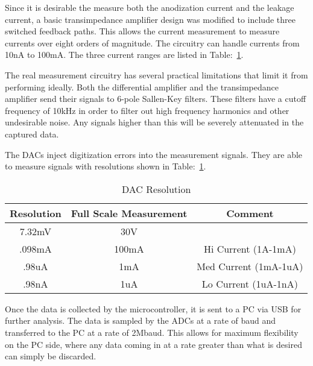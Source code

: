 Since it is desirable the measure both the anodization current and the leakage current, a basic transimpedance amplifier design was modified to include three switched feedback paths. This allows the current measurement to measure currents over eight orders of magnitude. The circuitry can handle currents from 10nA to 100mA. The three current ranges are listed in Table:~\ref{tab:dacRes}.

The real measurement circuitry has several practical limitations that limit it from performing ideally. Both the differential amplifier and the transimpedance amplifier send their signals to 6-pole Sallen-Key filters. These filters have a cutoff frequency of 10kHz\cite{sThesis} in order to filter out high frequency harmonics and other undesirable noise. Any signals higher than this will be severely attenuated in the captured data.

The DACs inject digitization errors into the measurement signals. They are able to measure signals with resolutions shown in Table:~\ref{tab:dacRes}.


\begin{table}[here]
\renewcommand{\arraystretch}{1.3}
\caption{DAC Resolution}
\label{tab:dacRes}
\centering
\begin{tabular}{c|c|c}
\hline
\bfseries Resolution & \bfseries Full Scale Measurement & \bfseries Comment\\
\hline\hline
7.32mV & 30V & \\
\hline
.098mA & 100mA & Hi Current (1A-1mA)\\
\hline
.98uA & 1mA & Med Current (1mA-1uA) \\
\hline
.98nA & 1uA & Lo Current (1uA-1nA)\\
\hline
\end{tabular}
\end{table}

Once the data is collected by the microcontroller, it is sent to a PC via USB for further analysis. The data is sampled by the ADCs at a rate of baud and transferred to the PC at a rate of 2Mbaud. This allows for maximum flexibility on the PC side, where any data coming in at a rate greater than what is desired can simply be discarded.

